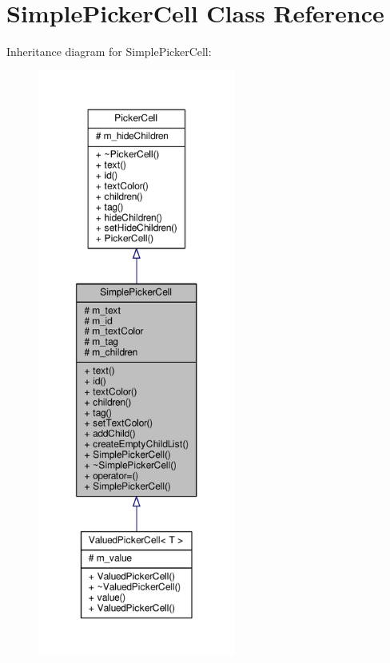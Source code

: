 \hypertarget{classSimplePickerCell}{}\section{Simple\+Picker\+Cell Class Reference}
\label{classSimplePickerCell}


Inheritance diagram for Simple\+Picker\+Cell\+:
\nopagebreak
\begin{figure}[H]
\begin{center}
\leavevmode
\includegraphics[height=550pt]{d1/d45/classSimplePickerCell__inherit__graph}
\end{center}
\end{figure}


